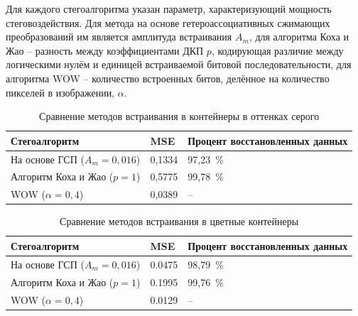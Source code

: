 Для каждого стегоалгоритма указан параметр, характеризующий мощность стеговоздействия. Для метода на основе гетероассоциативных сжимающих преобразований им является амплитуда встраивания $ A_m $, для алгоритма Коха и Жао – разность между коэффициентами ДКП $ p $, кодирующая различие между логическими нулём и единицей встраиваемой битовой последовательности, для алгоритма WOW – количество встроенных битов, делённое на количество пикселей в изображении, $ \alpha $.

\begin{table}[h!]
\centering
    \begin{tabular}{| l | l | l |}
    \hline
    Стегоалгоритм & MSE & Процент восстановленных данных \\ \hline
    На основе ГСП ($ A_m = 0,016 $) & 0,1334 & 97,23~\% \\ \hline
    Алгоритм Коха и Жао ($ p = 1 $) & 0,5775 & 99,78~\% \\ \hline
    WOW ($ \alpha = 0,4 $) & 0,0389 & – \\ \hline
    \end{tabular}
\caption{Сравнение методов встраивания в контейнеры в оттенках серого}
\label{table:1}
\end{table}

\begin{table}[h!]
\centering
    \begin{tabular}{| l | l | l |}
    \hline
    Стегоалгоритм & MSE & Процент восстановленных данных \\ \hline
    На основе ГСП ($ A_m = 0,016 $) & 0.0475 & 98,79~\% \\ \hline
    Алгоритм Коха и Жао ($ p = 1 $) & 0.1995 & 99,76~\% \\ \hline
    WOW ($ \alpha = 0,4 $) & 0.0129 & – \\ \hline
    \end{tabular}
\caption{Сравнение методов встраивания в цветные контейнеры}
\label{table:1Color}
\end{table}

